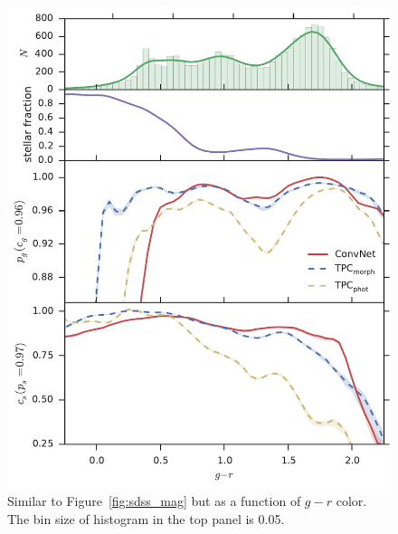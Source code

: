 \documentclass[fleqn,usenatbib]{mnras}
\begin{document}
\begin{figure}
  \centering
  \includegraphics[width=\columnwidth]{figures/sdss_g_r.pdf}
  \caption{Similar to Figure~\ref{fig:sdss_mag} but as a function of
    $g-r$ color. The bin size of histogram in the top panel is 0.05.}
  \label{fig:sdss_g_r}
\end{figure}
\end{document}
